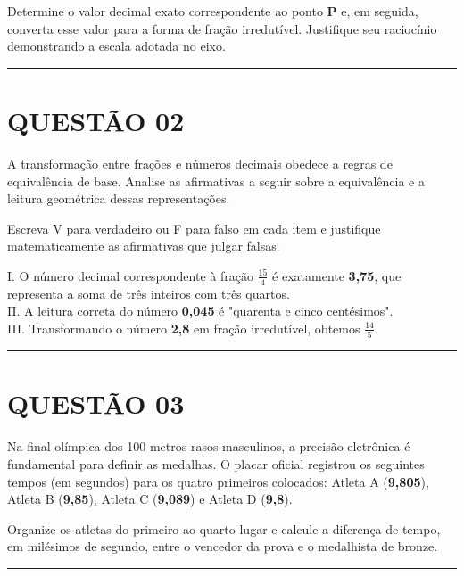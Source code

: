 \documentclass[12pt, a4paper]{article}
\begin{document}
Determine o valor decimal exato correspondente ao ponto \textbf{P} e, em seguida, converta esse valor para a forma de fração irredutível. Justifique seu raciocínio demonstrando a escala adotada no eixo.

\vspace{0.5cm} \noindent\rule{\textwidth}{0.4pt} \vspace{0.5cm}

\section*{QUESTÃO 02}

A transformação entre frações e números decimais obedece a regras de equivalência de base. Analise as afirmativas a seguir sobre a equivalência e a leitura geométrica dessas representações.

Escreva V para verdadeiro ou F para falso em cada item e justifique matematicamente as afirmativas que julgar falsas.

I. O número decimal correspondente à fração  $ \frac{15}{4} $  é exatamente \textbf{3,75}, que representa a soma de três inteiros com três quartos.\\[0.3cm]
II. A leitura correta do número \textbf{0,045} é "quarenta e cinco centésimos".\\[0.3cm]
III. Transformando o número \textbf{2,8} em fração irredutível, obtemos  $ \frac{14}{5} $.

\vspace{0.5cm} \noindent\rule{\textwidth}{0.4pt} \vspace{0.5cm}

\section*{QUESTÃO 03}

Na final olímpica dos 100 metros rasos masculinos, a precisão eletrônica é fundamental para definir as medalhas. O placar oficial registrou os seguintes tempos (em segundos) para os quatro primeiros colocados: Atleta A (\textbf{9,805}), Atleta B (\textbf{9,85}), Atleta C (\textbf{9,089}) e Atleta D (\textbf{9,8}).

Organize os atletas do primeiro ao quarto lugar e calcule a diferença de tempo, em milésimos de segundo, entre o vencedor da prova e o medalhista de bronze.

\vspace{0.5cm} \noindent\rule{\textwidth}{0.4pt} \vspace{0.5cm}
\end{document}
